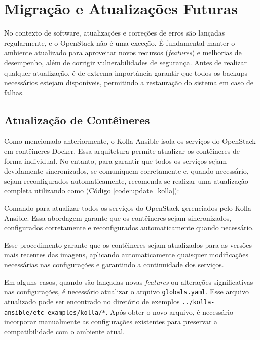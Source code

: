 \section{Migração e Atualizações Futuras}

No contexto de software, atualizações e correções de erros são lançadas regularmente, e o OpenStack não é uma exceção. É fundamental manter o ambiente atualizado para aproveitar novos recursos (\textit{features}) e melhorias de desempenho, além de corrigir vulnerabilidades de segurança. Antes de realizar qualquer atualização, é de extrema importância garantir que todos os backups necessários estejam disponíveis, permitindo a restauração do sistema em caso de falhas.

\subsection{Atualização de Contêineres}

Como mencionado anteriormente, o Kolla-Ansible isola os serviços do OpenStack em contêineres Docker. Essa arquitetura permite atualizar os contêineres de forma individual. No entanto, para garantir que todos os serviços sejam devidamente sincronizados, se comuniquem corretamente e, quando necessário, sejam reconfigurados automaticamente, recomenda-se realizar uma atualização completa utilizando como (Código \ref{code:update_kolla}):

\begin{listing}[h!]
    \noindent{}  
  \caption{Comando para atualizar todos os serviços do OpenStack gerenciados pelo Kolla-Ansible. Essa abordagem garante que os contêineres sejam sincronizados, configurados corretamente e reconfigurados automaticamente quando necessário.}
  \label{code:update_kolla}
\end{listing}

Esse procedimento garante que os contêineres sejam atualizados para as versões mais recentes das imagens, aplicando automaticamente quaisquer modificações necessárias nas configurações e garantindo a continuidade dos serviços.

Em alguns casos, quando são lançadas novas \textit{features} ou alterações significativas nas configurações, é necessário atualizar o arquivo \texttt{globals.yaml}. Esse arquivo atualizado pode ser encontrado no diretório de exemplos \texttt{../kolla-ansible/etc\_examples/kolla/*}. Após obter o novo arquivo, é necessário incorporar manualmente as configurações existentes para preservar a compatibilidade com o ambiente atual.


